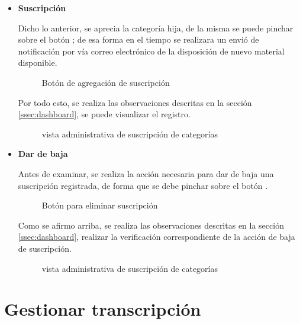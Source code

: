\begin{itemize}

\item \textbf{Suscripción}

Dicho lo anterior, se aprecia la categoría hija, de la misma se puede pinchar sobre
el botón ; de esa forma en el tiempo se realizara un
envió de notificación por vía correo electrónico de la disposición de nuevo material
disponible.

\begin{figure}[!ht]
\centering
		\caption{Botón de agregación de suscripción}
\end{figure}

Por todo esto, se realiza las observaciones descritas en la sección
\ref{ssec:dashboard}, se puede visualizar el registro.  

\begin{figure}[!ht]
\centering
		\caption{vista administrativa de suscripción de categorías}
\end{figure}

\item \textbf{Dar de baja}

Antes de examinar, se realiza la acción necesaria para dar de baja una
suscripción registrada, de forma que se debe pinchar sobre el botón 
.

\begin{figure}[!ht]
\centering
		\caption{Botón para eliminar suscripción}
\end{figure}

Como se afirmo arriba, se realiza las observaciones descritas en la sección
\ref{ssec:dashboard}, realizar la verificación correspondiente de la acción
de baja de suscripción.  

\begin{figure}[!ht]
\centering
		\caption{vista administrativa de suscripción de categorías}
\end{figure}

\end{itemize}

\section{Gestionar transcripción}

